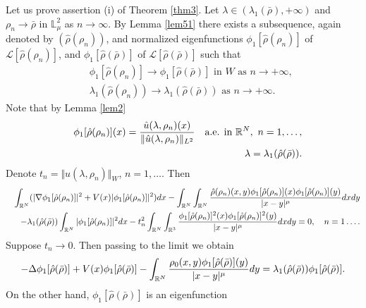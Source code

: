 \documentclass[12pt,thmsa]{article}
\begin{document}
Let us prove assertion (i) of Theorem \ref{thm3}. Let $\lambda \in (\lambda
_{1}(\bar{\rho}),+\infty )$ and $\rho _{n}\rightarrow \bar{\rho}$ in $%
\mathbb{L}_{\mu }^{2}$ as $n\rightarrow \infty $. By Lemma \ref{lem51} there
exists a subsequence, again denoted by $(\hat{\rho}(\rho _{n}))$, and
normalized eigenfunctions $\phi _{1}[\hat{\rho}(\rho _{n})]$ of $\mathcal{L}[%
\hat{\rho}(\rho _{n})]$, and $\phi _{1}[\hat{\rho}(\bar{\rho})]$ of $%
\mathcal{L}[\hat{\rho}(\bar{\rho})]$ such that
\begin{eqnarray*}
&&\phi _{1}[\hat{\rho}(\rho _{n})]\rightarrow \phi _{1}[\hat{\rho}(\bar{\rho}%
)]\text{ in }W\text{ as }n\rightarrow +\infty ,  \label{eq:phi_conv} \\
&&\lambda _{1}(\hat{\rho}(\rho _{n}))\rightarrow \lambda _{1}(\hat{\rho}(%
\bar{\rho}))\text{ as }n\rightarrow +\infty .  \label{eq:lamb_conv}
\end{eqnarray*}%
Note that by Lemma \ref{lem2}
\begin{eqnarray*}
&&\phi _{1}[\hat{\rho}(\rho _{n})](x)=\frac{\hat{u}(\lambda ,\rho _{n})(x)}{%
\Vert \hat{u}(\lambda ,\rho _{n})\Vert _{L^{2}}}\quad \text{a.e. in }\mathbb{%
R}^{N},\text{ }n=1,\ldots , \\
&&\lambda =\lambda _{1}(\hat{\rho}(\bar{\rho})).
\end{eqnarray*}%
Denote $t_{n}=\Vert \hat{u}(\lambda ,\rho _{n})\Vert _{W}$, $n=1,\ldots $.
Then
\begin{eqnarray*}
&&\int_{\mathbb{R}^{N}}(|\nabla \phi _{1}[\hat{\rho}(\rho
_{n})]|^{2}+V(x)|\phi _{1}[\hat{\rho}(\rho _{n})]|^{2})dx-\int_{\mathbb{R}%
^{N}}\int_{\mathbb{R}^{N}}\frac{\hat{\rho}(\rho _{n})(x,y)\phi _{1}[\hat{\rho%
}(\rho _{n})](x)\phi _{1}[\hat{\rho}(\rho _{n})](y)}{|x-y|^{\mu }}dxdy \\
&&-\lambda _{1}(\hat{\rho}(\bar{\rho}))\int_{\mathbb{R}^{N}}|\phi _{1}[\hat{%
\rho}(\rho _{n})]|^{2}dx-t_{n}^{2}\int_{\mathbb{R}^{N}}\int_{\mathbb{R}^{3}}%
\frac{\phi _{1}[\hat{\rho}(\rho _{n})]^{2}(x)\phi _{1}[\hat{\rho}(\rho
_{n})]^{2}(y)}{|x-y|^{\mu }}dxdy=0,\quad n=1\ldots .
\end{eqnarray*}%
Suppose $t_{n}\rightarrow 0$. Then passing to the limit we obtain
\begin{equation*}
-\Delta \phi _{1}[\hat{\rho}(\bar{\rho})]+V(x)\phi _{1}[\hat{\rho}(\bar{\rho}%
)]-\int_{\mathbb{R}^{N}}\frac{\rho _{0}(x,y)\phi _{1}[\hat{\rho}(\bar{\rho}%
)](y)}{|x-y|^{\mu }}dy=\lambda _{1}(\hat{\rho}(\bar{\rho}))\phi _{1}[\hat{%
\rho}(\bar{\rho})].
\end{equation*}%
On the other hand, $\phi _{1}[\hat{\rho}(\bar{\rho})]$ is an eigenfunction
\end{document}

